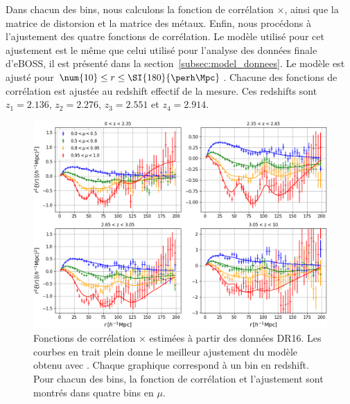 Dans chacun des bins, nous calculons la fonction de corrélation \lya{}$\times$\lya{}, ainsi que la matrice de distorsion et la matrice des métaux.
Enfin, nous procédons à l'ajustement des quatre fonctions de corrélation. Le modèle utilisé pour cet ajustement est le même que celui utilisé pour l'analyse des données finale d'eBOSS, il est présenté dans la section~\ref{subsec:model_donnees}.
Le modèle est ajusté pour $\num{10} \leq r \leq \SI{180}{\perh\Mpc}$.
Chacune des fonctions de corrélation est ajustée au redshift effectif de la mesure. Ces redshifts sont $z_1 = \num{2.136}$, $z_2 = \num{2.276}$, $z_3 = \num{2.551}$ et $z_4 = \num{2.914}$.

\begin{figure}
  \centering
  \includegraphics[scale=0.4]{dr16_4bins}
  \caption{Fonctions de corrélation \lya{}$\times$\lya{} estimées à partir des données DR16. Les courbes en trait plein donne le meilleur ajustement du modèle obtenu avec \picca{}. Chaque graphique correspond à un bin en redshift. Pour chacun des bins, la fonction de corrélation et l'ajustement sont montrés dans quatre bins en $\mu$.}
  \label{fig:dr16_4bins}
\end{figure}


